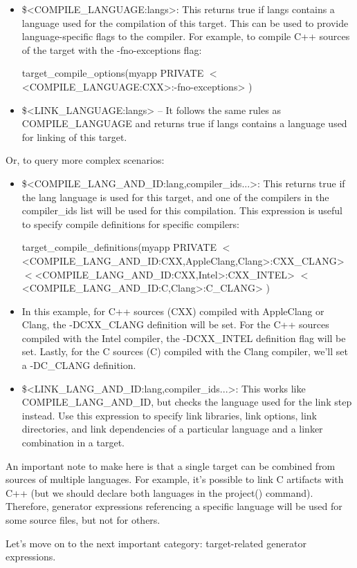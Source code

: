 \begin{itemize}
\item
\$<COMPILE\_LANGUAGE:langs>: This returns true if langs contains a language used for the compilation of this target. This can be used to provide language-specific flags to the compiler. For example, to compile C++ sources of the target with the -fno-exceptions flag:

\begin{cmake}
target_compile_options(myapp
    PRIVATE $<$<COMPILE_LANGUAGE:CXX>:-fno-exceptions>
)
\end{cmake}

\item
\$<LINK\_LANGUAGE:langs> – It follows the same rules as COMPILE\_LANGUAGE and returns true if langs contains a language used for linking of this target.
\end{itemize}

Or, to query more complex scenarios:

\begin{itemize}
\item
\$<COMPILE\_LANG\_AND\_ID:lang,compiler\_ids...>: This returns true if the lang language is used for this target, and one of the compilers in the compiler\_ids list will be used for this compilation. This expression is useful to specify compile definitions for specific compilers:

\begin{cmake}
target_compile_definitions(myapp PRIVATE
    $<$<COMPILE_LANG_AND_ID:CXX,AppleClang,Clang>:CXX_CLANG>
    $<$<COMPILE_LANG_AND_ID:CXX,Intel>:CXX_INTEL>
    $<$<COMPILE_LANG_AND_ID:C,Clang>:C_CLANG>
)
\end{cmake}

\item
In this example, for C++ sources (CXX) compiled with AppleClang or Clang, the -DCXX\_CLANG definition will be set. For the C++ sources compiled with the Intel compiler, the -DCXX\_INTEL definition flag will be set. Lastly, for the C sources (C) compiled with the Clang compiler, we’ll set a -DC\_CLANG definition.

\item
\$<LINK\_LANG\_AND\_ID:lang,compiler\_ids...>: This works like COMPILE\_LANG\_AND\_ID, but checks the language used for the link step instead. Use this expression to specify link libraries, link options, link directories, and link dependencies of a particular language and a linker combination in a target.
\end{itemize}

An important note to make here is that a single target can be combined from sources of multiple languages. For example, it’s possible to link C artifacts with C++ (but we should declare both languages in the project() command). Therefore, generator expressions referencing a specific language will be used for some source files, but not for others.

Let’s move on to the next important category: target-related generator expressions.


